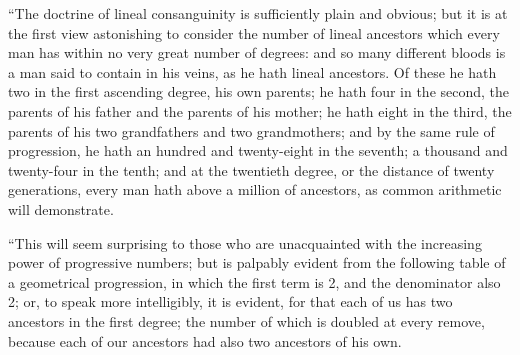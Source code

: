 ``The doctrine of lineal consanguinity is sufficiently plain and
obvious; but it is at the first view astonishing to consider the
number of lineal ancestors which every man has within no very
great number of degrees: and so many different bloods is a man
said to contain in his veins, as he hath lineal ancestors. Of
these he hath two in the first ascending degree, his own parents;
he hath four in the second, the parents of his father and the
parents of his mother; he hath eight in the third, the parents of
his two grandfathers and two grandmothers; and by the same rule of
progression, he hath an hundred and twenty-eight in the seventh; a
thousand and twenty-four in the tenth; and at the twentieth
degree, or the distance of twenty generations, every man hath
above a million of ancestors, as common arithmetic will
demonstrate.

``This will seem surprising to those who are unacquainted with the
increasing power of progressive numbers; but is palpably evident
from the following table of a geometrical progression, in which
the first term is 2, and the denominator also 2; or, to speak more
intelligibly, it is evident, for that each of us has two ancestors
in the first degree; the number of which is doubled at every
remove, because each of our ancestors had also two ancestors of
his own.

